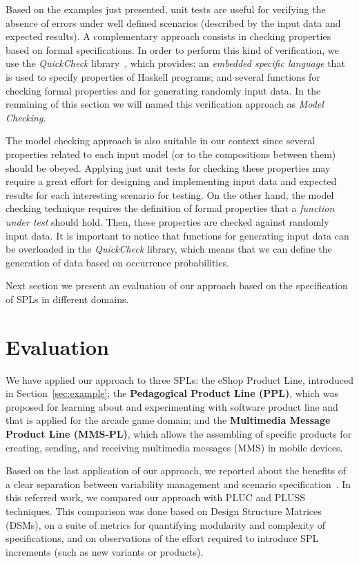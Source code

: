 \documentclass{acm_proc_article-sp}
\begin{document}
Based on the examples just presented, unit tests are useful for 
verifying the absence of errors under well defined scenarios 
(described by the input data and expected results). A complementary 
approach consists in checking properties based on formal 
specifications. In order to perform this kind of verification, we use 
the \emph{QuickCheck} library~\cite{claessen00-icfp-2000}, which provides: 
an \emph{embedded specific language} that is used to specify 
properties of Haskell programs; and several functions for checking 
formal properties and for generating randomly input data. In the remaining 
of this section we will named this verification approach as \emph{Model Checking}.

The model checking approach is also suitable in our context since 
several properties related to each input model (or to the compositions between them) 
should be obeyed. Applying just unit tests for checking these properties may 
require a great effort for designing and implementing input data and expected results 
for each interesting scenario for testing. On the other hand, the model checking 
technique requires the definition of formal properties that a \emph{function under test} 
should hold. Then, these properties are checked against randomly input data. It is important 
to notice that functions for generating input data can be overloaded in the \emph{QuickCheck} 
library, which means that we can define the generation of data based on occurrence probabilities.

Next section we present an evaluation of our approach based on the 
specification of SPLs in different domains. 

\section{Evaluation}
\label{sec:evaluation}

We have applied our approach to three SPLs: the eShop Product Line, introduced in Section~\ref{sec:example}; the  
{\bf Pedagogical Product Line (PPL)}, which was proposed for learning about and experimenting with software product line and that is applied for the arcade game domain; and the 
{\bf Multimedia Message Product Line (MMS-PL)}, which allows the assembling of specific products for creating, sending, and receiving multimedia messages (MMS) in mobile devices.

Based on the last application of our approach, we reported about the benefits of a clear separation between variability management and scenario specification~\cite{rbonifacio-ea-2008}. In this referred work, we compared our approach with PLUC and PLUSS techniques. This comparison was done based on Design Structure Matrices (DSMs), on a suite of metrics for quantifying modularity and complexity of specifications, and on observations of the effort required to introduce SPL increments (such as new variants or products). 
\end{document}
